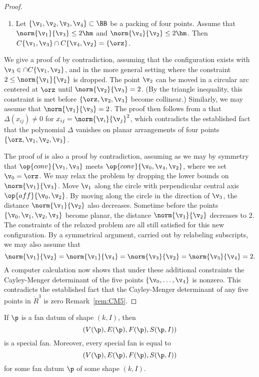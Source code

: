 \begin{proof}
\begin{enumerate}
  Then $\v_3\not\in\cap C\{\v_1,\v_2\}$.
\item {} Let $\{\v_1,\v_2,\v_3,\v_4\}\subset \BB$ be a
  packing of four points.  Assume that $\norm{\v_1}{\v_3}\le 2\hm$ and
  $\norm{\v_4}{\v_2}\le 2\hm$.  Then $C\{\v_1,\v_3\}\cap
  C\{\v_4,\v_2\} = \{\orz\}$.
\end{enumerate}
We give a proof of  by contradiction, assuming that
the configuration exists with $\v_3\in\cap C\{\v_1,\v_2\}$, and in the
more general setting where the constraint $2\le \norm{\v_1}{\v_2}$ is
dropped.  The point $\v_2$ can be moved in a circular arc centered at
$\orz$ until $\norm{\v_2}{\v_3}=2$.  (By the triangle inequality, this
constraint is met before $\{\orz,\v_2,\v_3\}$ become collinear.)
Similarly, we may assume that $\norm{\v_1}{\v_3}=2$.  The proof then
follows from a  that $\Delta(x_{ij})\ne0$ for  
$x_{ij}=\norm{\v_i}{\v_j}^2$, which contradicts the established fact
that the polynomial $\Delta$ vanishes on planar arrangements of four
points $\{\orz,\v_1,\v_2,\v_3\}$.


The proof of  is also a proof by contradiction,
assuming as we may by symmetry that $\op{conv}\{\v_1,\v_3\}$ meets
$\op{conv}\{\v_0,\v_4,\v_2\}$, where we set $\v_0=\orz$.  We may relax
the problem by dropping the lower bounds on $\norm{\v_1}{\v_3}$.  Move
$\v_1$ along the circle with perpendicular central axis
$\op{aff}\{\v_0,\v_2\}$. By moving along the circle in the direction
of $\v_3$, the distance $\norm{\v_1}{\v_2}$ also decreases.  Sometime
before the points $\{\v_0,\v_1,\v_2,\v_3\}$ become planar, the
distance $\norm{\v_1}{\v_2}$ decreases to $2$.  The constraints of the
relaxed problem are all still satisfied for this new configuration.
By a symmetrical argument, carried out by relabeling subscripts, we
may also assume that
\[
\norm{\v_1}{\v_2}= \norm{\v_1}{\v_4}=\norm{\v_3}{\v_2}=\norm{\v_3}{\v_4}=2.
\]
A computer calculation now shows that under these additional
constraints the Cayley-Menger determinant of the five points
$\{\v_0,\ldots,\v_4\}$ is nonzero.  This contradicts the established
fact that the Cayley-Menger determinant of any five points in
$\ring{R}^3$ is zero Remark~\ref{rem:CM5}.

\end{proof}

\begin{lemma}[]
If $\p$ is a fan datum of shape $(k,I)$, then
\[ 
(V(\p),E(\p),F(\p),S(\p,I))
\] 
is a special fan.  Moreover, every special fan is equal to
\[ 
(V(\p),E(\p),F(\p),S(\p,I))
\] 
for some fan datum $\p$ of some shape $(k,I)$.
\end{lemma}

